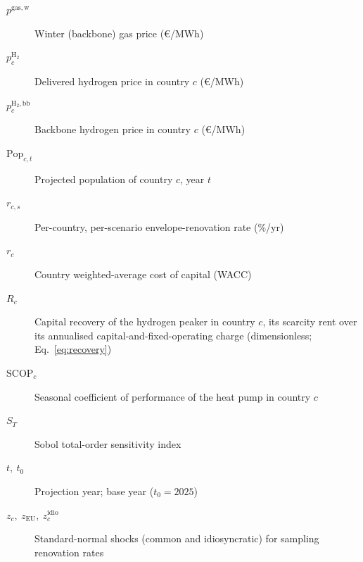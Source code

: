 \documentclass[review]{elsarticle}
\begin{document}
\begin{description}
 \item[$p^{\mathrm{gas,w}}$] Winter (backbone) gas price (\euro{}/MWh)
 \item[$p^{\mathrm{H_2}}_{c}$] Delivered hydrogen price in country $c$ (\euro{}/MWh)
 \item[$p^{\mathrm{H_2,bb}}_{c}$] Backbone hydrogen price in country $c$ (\euro{}/MWh)
 \item[$\mathrm{Pop}_{c,t}$] Projected population of country $c$, year $t$
 \item[$r_{c,s}$] Per-country, per-scenario envelope-renovation rate (\%/yr)
 \item[$r_{c}$] Country weighted-average cost of capital (WACC)
 \item[$R_{c}$] Capital recovery of the hydrogen peaker in country $c$, its scarcity rent
over its annualised capital-and-fixed-operating charge (dimensionless;
Eq.~\eqref{eq:recovery})
 \item[$\mathrm{SCOP}_{c}$] Seasonal coefficient of performance of the heat pump in country $c$
 \item[$S_{T}$] Sobol total-order sensitivity index
 \item[$t,\ t_{0}$] Projection year; base year ($t_{0}=2025$)
 \item[$z_{c},\ z_{\mathrm{EU}},\ z_{c}^{\mathrm{idio}}$] Standard-normal shocks (common and idiosyncratic) for sampling renovation rates
\end{description}
\end{document}
